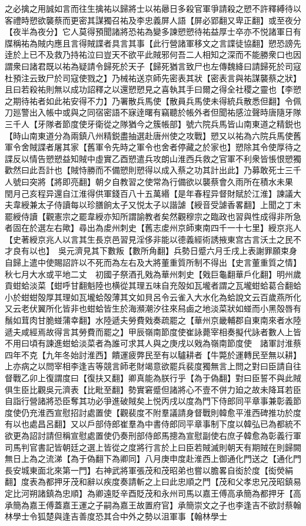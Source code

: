 之必擒之用誠如言而往生擒祐以歸將士以祐曏日多殺官軍爭請殺之愬不許釋縛待以客禮時愬欲襲蔡而更密其謀獨召祐及李忠義屏人語【屏必郢翻又卑正翻】或至夜分【夜半為夜分】它人莫得預聞諸將恐祐為變多諫愬愬待祐益厚士卒亦不悦諸軍日有牒稱祐為賊内應且言得賊諜者具言其事【此行營諸軍移文之言諜徒協翻】愬恐謗先逹於上已不及救乃持祐泣曰豈天不欲平此賊邪何吾二人相知之深而不能勝衆口也因謂衆曰諸君既以祐為疑請令歸死於天子【歸死猶言致尸也左傳魏絳曰請歸死於司寇杜預注云致尸於司寇使戮之】乃械祐送京師先密表其狀【密表言與祐謀襲蔡之狀】且曰若殺祐則無以成功詔釋之以還愬愬見之喜執其手曰爾之得全社稷之靈也【李愬之期待祐者如此祐安得不力】乃署散兵馬使【散員兵馬使未得統兵散悉但翻】令佩刀廵警出入帳中或與之同宿密語不寐逹曙有竊聽於帳外者但聞祐感泣聲時唐隨牙隊三千人【牙隊者節度使牙衛從之隊猶今之簇帳部】號六院兵馬皆山南東道之精鋭也【時山南東道分為兩鎮八州精鋭盡抽選赴唐州使之攻戰】愬又以祐為六院兵馬使舊軍令舍賊諜者屠其家【舊軍令先時之軍令也舍者停藏之於家也】愬除其令使厚待之諜反以情告愬愬益知賊中虛實乙酉愬遣兵攻朗山淮西兵救之官軍不利衆皆悵恨愬獨歡然曰此吾計也【賊恃勝而不備愬則愬得以成入蔡之功其計出此】乃募敢死士三千人號曰突將【將即亮翻】朝夕自教習之使常為行備欲以襲蔡會久雨所在積水未果　閏月己亥程异還自江淮得供軍錢百八十五萬緡【是年春程异督財賦於江淮】諫議大夫韋綬兼太子侍讀每以珍膳餉太子又悦太子以諧謔【綬音受謔香畧翻】上聞之丁未罷綬侍讀【觀憲宗之罷韋綬亦知所謂諭教者矣然觀穆宗之臨政也習與性成得非所急者固在於選左右歟】尋出為䖍州刺史【舊志䖍州京師東南四千一十七里】綬京兆人【史著綬京兆人以言其生長京邑習見淫侈非能以德義經術誘掖東宫古言沃土之民不才良有以也】　吳元濟見其下數叛【數所角翻】兵勢日蹙六月壬戌上表謝罪願束身自歸上遣中使賜詔許以不死而為左右及大將董重質所制不得出【史言董重質之情】　秋七月大水或平地二丈　初國子祭酒孔戣為華州刺史【戣巨龜翻華戶化翻】明州歲貢蚶蛤淡菜【蚶呼甘翻魁陸也横從其理五味自充殻如瓦壠者謂之瓦壠蚶蛤葛合翻蛤小於蚶蚶殻厚其理如瓦壠蛤殻薄其文如貝呂令云雀入大水化為蛤說文云百歲燕所化又云老伏翼所化皆非也蚶蛤皆生於海瀕潮汐往來舄鹵之地淡菜狀如䗒而小黑殻唇有鬚如茸肉甘脆䗒蒲幸翻】水陸遞夫勞費戣奏疏罷之【華州京畿輔郡自東南來者水陸遞夫咸經焉故得言其勞費而罷之】甲辰嶺南節度使崔詠薨宰相奏擬代詠者數人上皆不用曰頃有諫進蚶蛤淡菜者為誰可求其人與之庚戌以戣為嶺南節度使　諸軍討淮蔡四年不克【九年冬始討淮西】饋運疲弊民至有以驢耕者【牛斃於運轉民至無以耕】上亦病之以問宰相李逢吉等競言師老財竭意欲罷兵裴度獨無言上問之對曰臣請自往督戰乙卯上復謂度曰【復扶又翻】卿真能為朕行乎【為于偽翻】對曰臣誓不與此賊俱生臣比觀吳元濟表【比毗至翻】勢實窘蹙但諸將心不壹不併力廹之故未降耳若臣自詣行營諸將恐臣奪其功必爭進破賊矣上悦丙戌以度為門下侍郎同平章事兼彰義節度使仍充淮西宣慰招討處置使【觀裴度不附羣議請身督戰則韓愈平淮西碑推功於度有以也處昌呂翻】又以戶部侍郎崔羣為中書侍郎同平章事制下度以韓弘已為都統不欲更為詔討請但稱宣慰處置使仍奏刑部侍郎馬摠為宣慰副使右庶子韓愈為彰義行軍司馬判官書記皆朝廷之選上皆從之度將行言於上曰臣若賊滅則朝天有期賊在則歸闕無日上為之流涕【為于偽翻下為卿同】八月庚申度赴淮西上御通化門送之【通化門長安城東面北來第一門】右神武將軍張茂和茂昭弟也嘗以膽畧自衒於度【衒熒絹翻】度表為都押牙茂和辭以疾度奏請斬之上曰此忠順之門【茂和父孝忠兄茂昭鎮易定比河朔諸鎮為忠順】為卿遠貶辛酉貶茂和永州司馬以嘉王傅高承簡為都押牙【高承簡為嘉王傅蓋嘉王運之子嗣為嘉王故置府官】承簡崇文之子也李逢吉不欲討蔡翰林學士令狐楚與逢吉善度恐其合中外之勢以沮軍事【翰林學士